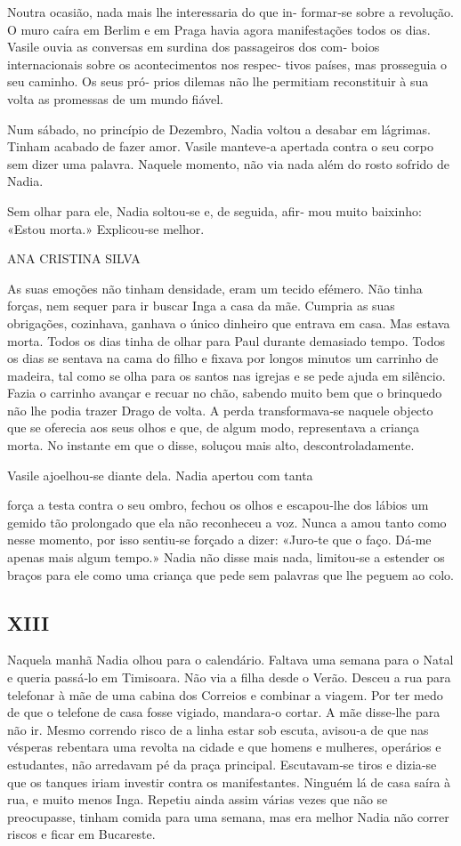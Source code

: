 Noutra ocasião, nada mais lhe interessaria do que in‑ formar‑se sobre a
revolução. O muro caíra em Berlim e em Praga havia agora manifestações
todos os dias. Vasile ouvia as conversas em surdina dos passageiros dos
com‑ boios internacionais sobre os acontecimentos nos respec‑ tivos
países, mas prosseguia o seu caminho. Os seus pró‑ prios dilemas não lhe
permitiam reconstituir à sua volta as promessas de um mundo fiável.

Num sábado, no princípio de Dezembro, Nadia voltou a desabar em
lágrimas. Tinham acabado de fazer amor. Vasile manteve‑a apertada contra
o seu corpo sem dizer uma palavra. Naquele momento, não via nada além do
rosto sofrido de Nadia.

Sem olhar para ele, Nadia soltou‑se e, de seguida, afir‑ mou muito
baixinho: «Estou morta.» Explicou‑se melhor.

ANA CRISTINA SILVA

As suas emoções não tinham densidade, eram um tecido efémero. Não tinha
forças, nem sequer para ir buscar Inga a casa da mãe. Cumpria as suas
obrigações, cozinhava, ganhava o único dinheiro que entrava em casa. Mas
estava morta. Todos os dias tinha de olhar para Paul durante demasiado
tempo. Todos os dias se sentava na cama do filho e fixava por longos
minutos um carrinho de madeira, tal como se olha para os santos nas
igrejas e se pede ajuda em silêncio. Fazia o carrinho avançar e recuar
no chão, sabendo muito bem que o brinquedo não lhe podia trazer Drago de
volta. A perda transformava‑se naquele objecto que se oferecia aos seus
olhos e que, de algum modo, representava a criança morta. No instante em
que o disse, soluçou mais alto, descontroladamente.

Vasile ajoelhou‑se diante dela. Nadia apertou com tanta

força a testa contra o seu ombro, fechou os olhos e escapou‑lhe dos
lábios um gemido tão prolongado que ela não reconheceu a voz. Nunca a
amou tanto como nesse momento, por isso sentiu‑se forçado a dizer:
«Juro‑te que o faço. Dá‑me apenas mais algum tempo.» Nadia não disse
mais nada, limitou‑se a estender os braços para ele como uma criança que
pede sem palavras que lhe peguem ao colo.


\subsection{XIII}

Naquela manhã Nadia olhou para o calendário. Faltava uma semana para o
Natal e queria passá‑lo em Timisoara. Não via a filha desde o Verão.
Desceu a rua para telefonar à mãe de uma cabina dos Correios e combinar
a viagem. Por ter medo de que o telefone de casa fosse vigiado,
mandara‑o cortar. A mãe disse‑lhe para não ir. Mesmo correndo risco de a
linha estar sob escuta, avisou‑a de que nas vésperas rebentara uma
revolta na cidade e que homens e mulheres, operários e estudantes, não
arredavam pé da praça principal. Escutavam‑se tiros e dizia‑se que os
tanques iriam investir contra os manifestantes. Ninguém lá de casa saíra
à rua, e muito menos Inga. Repetiu ainda assim várias vezes que não se
preocupasse, tinham comida para uma semana, mas era melhor Nadia não
correr riscos e ficar em Bucareste.

